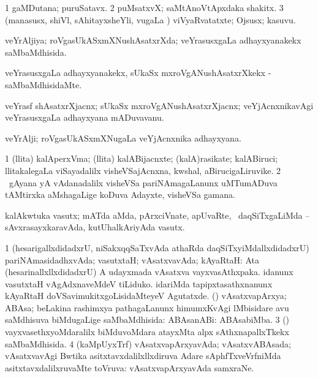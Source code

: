 {{{{{{{{\bentry
{} 
\gl{\nA}
\expl{}
\bmng
\bnum
\num{1} gaMDutana; puruSatavx. 
\num{2} puMsatxvX; saMtAnoVtApxdaka shakitx. 
\num{3} (manasusx, shiVl, sAhitayxsheYli, \mo vugaLa \vi) viVyaRvatatxte; Ojsusx; kasuvu. 
\enum
\emng
\eentry

\bentry 
{} 
\gl{\gu}
\expl{}
\bmng
 veYrAljiya; roVgasUkASxmXNushAsatxrXda; veYrasusxgaLa adhayxyanakekx saMbaMdhisida. 
\emng
\eentry

\bentry
{} 
\gl{\kirxvi}
\expl{}
\bmng
 veYrasusxgaLa adhayxyanakekx, sUkaSx mxroVgANushAsatxrXkekx -saMbaMdhisidaMte. 
\emng
\eentry

\bentry
{} 
\gl{\nA}
\expl{}
\bmng
 veYrasf shAsatxrXjacnx; sUkaSx mxroVgANushAsatxrXjacnx; veYjAcnxnikavAgi veYrasusxgaLa adhayxyana mADuvavanu. 
\emng
\eentry

\bentry
{} 
\gl{\nA}
\expl{}
\bmng
 veYrAlji; roVgasUkASxmXNugaLa veYjAcnxnika adhayxyana. 
\emng
\eentry

\bentry
{} 
\gl{\nA}
\expl{}
\bmng
\bnum
\num{1} (llita) kalAperxVma; (llita) kalABijacnxte; (kalA)rasikate; kalABiruci; llitakalegaLa viSayadalilx visheVSajAcnxna, kwshal, aBirucigaLiruvike. 
\hypertarget{virtu(2)}{} 
\num{2} \kanmu\ gAyana yA vAdanadalilx visheVSa pariNAmagaLanunx uMTumADuva tAMtirxka aMshagaLige koDuva Adayxte, visheVSa gamana. 
\enum
\emng

\noindent 
\gl{\pagu}
\expl{}
\bmng
  kalAkwtuka vasutx; mATda aMda, pArxciVnate, apUvaRte, \mo\ daqSiTxgaLiMda -- sAvxrasayxkaravAda, kutUhalkAriyAda vasutx. 
\emng
\eentry

\bentry 
{} 
\gl{\gu}
\expl{}
\bmng
\bnum
\num{1} (hesarigallxdidadxrU, niSakxqqSaTxvAda athaRda daqSiTxyiMdallxdidadxrU) pariNAmasidadhxvAda; vasutxtaH; vAsatxvavAda; kAyaRtaH:  Ata (hesarinallxllxdidadxrU) A udayxmada vAsatxva vayxvasAthxpaka.  idanunx vasutxtaH vAgAdxnaveMdeV tiLiduko.  idariMda tapipxtasathxnanunx kAyaRtaH doVSavimukitxgoLisidaMteyeV Agutatxde. (\daqvi) vAsatxvapArxya; ABAsa; beLakina rashimxya pathagaLanunx himumxKvAgi lMbisidare avu saMdhisuva biMdugaLige saMbaMdhisida:  ABAsanABi:  ABAsabiMba. 
\num{3} (\yaMshA) vayxvasethxyoMdaralilx biMduvoMdara atayxMta alpx sAthxnapallxTkekx saMbaMdhisida. 
\num{4} (kaMpUyxTrf) vAsatxvapArxyavAda; vAsatxvABAsada; vAsatxvavAgi Bwtika asitxtavxdalilxllxdiruva Adare sAphfTxveVrfniMda asitxtavxdalilxruvaMte toVruva:  vAsatxvapArxyavAda samxraNe. 
\enum
\emng
\eentry

}}}}}}}}
